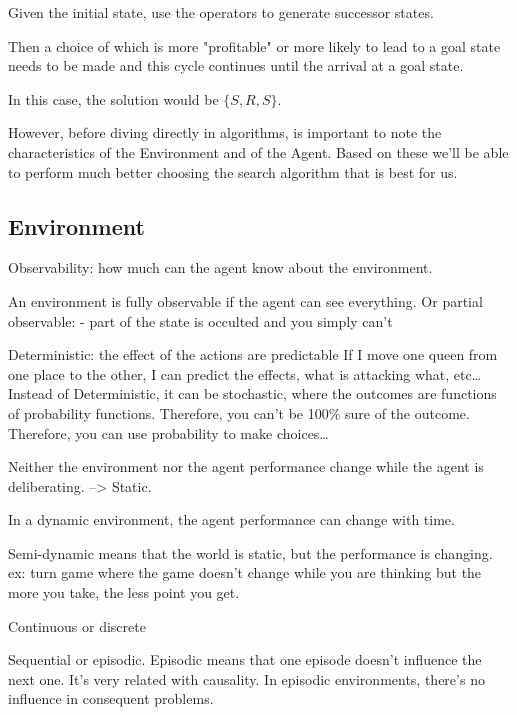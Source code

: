 Given the initial state, use the operators to generate successor states.


Then a choice of which is more "profitable" or more likely to lead to a goal state needs to be made and this cycle continues until the arrival at a goal state.


In this case, the solution would be $\{S, R, S\}$.




However, before diving directly in algorithms, is important to note the characteristics of the Environment and of the Agent. Based on these we'll be able to perform much better choosing the search algorithm that is best for us.

\subsection{Environment} %

Observability: how much can the agent know about the environment.

An environment is fully observable if the agent can see everything. Or partial observable:
- part of the state is occulted and you simply can't 



Deterministic: the effect of the actions are predictable
If I move one queen from one place to the other, I can predict the effects, what is attacking what, etc\dots
Instead of Deterministic, it can be stochastic, where the outcomes are functions of probability functions. Therefore, you can't be 100\% sure of the outcome. Therefore, you can use probability to make choices\dots


Neither the environment nor the agent performance change while the agent is deliberating. --> Static.

In a dynamic environment, the agent performance can change with time. 

Semi-dynamic means that the world is static, but the performance is changing. 
ex: turn game where the game doesn't change while you are thinking but the more you take, the less point you get.

Continuous or discrete


Sequential or episodic. Episodic means that one episode doesn't influence the next one. It's very related with causality. In episodic environments, there's no influence in consequent problems.

